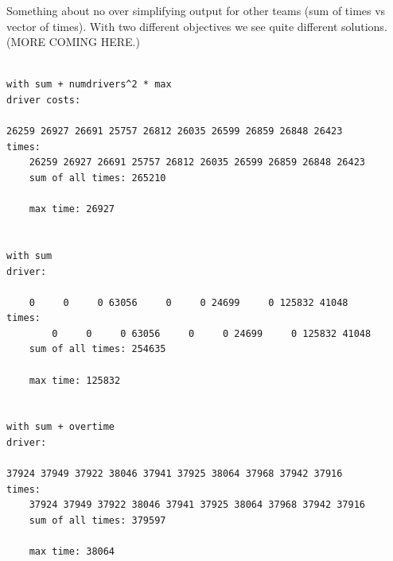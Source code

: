 \documentclass{article}
\begin{document}
Something about no over simplifying output for other teams (sum of times vs vector of times).
With two different objectives we see quite different solutions.
(MORE COMING HERE.)

\begin{verbatim}

with sum + numdrivers^2 * max
driver costs: 
	
26259 26927 26691 25757 26812 26035 26599 26859 26848 26423 
times: 
	26259 26927 26691 25757 26812 26035 26599 26859 26848 26423 
	sum of all times: 265210

	max time: 26927
	
	
with sum
driver: 
	
    0     0     0 63056     0     0 24699     0 125832 41048 
times: 
	    0     0     0 63056     0     0 24699     0 125832 41048 
	sum of all times: 254635

	max time: 125832
	
	
with sum + overtime
driver: 
	
37924 37949 37922 38046 37941 37925 38064 37968 37942 37916 
times: 
	37924 37949 37922 38046 37941 37925 38064 37968 37942 37916 
	sum of all times: 379597

	max time: 38064

\end{verbatim}



\end{document}
